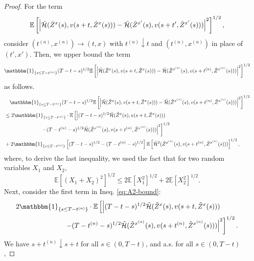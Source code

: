 \documentclass[11pt]{article}
\theoremstyle{definition}
\theoremstyle{plain}
\newcommand{\E}{\mathbb{E}}
\newcommand{\cH}{{\cal H}}
\newcommand{\mbOne}{\mathbbm{1}}
\begin{document}
\begin{appendices}
\begin{proof}
For the term
\[
\mathbb{E} \left[ \left| \tilde \cH(\tilde{Z}^x(s), v(s + t, \tilde{Z}^x(s))) 
- \tilde \cH(\tilde{Z}^{x'}(s), v(s + t', \tilde{Z}^{x'}(s))) \right|^2 \right]^{1/2}, 
\]
consider \( (t^{(n)}, x^{(n)}) \to (t,x) \) with \( t^{(n)} \downarrow t \) 
and \( (t^{(n)}, x^{(n)}) \) in place of \( (t', x') \). Then, we upper bound the term 
\begin{align*}
\mbOne_{\{s \leq T - t^{(n)}\}} (T - t - s)^{1/2} \mathbb{E} \left[ \left|  
\tilde \cH(\tilde{Z}^x(s), v(s + t, \tilde{Z}^x(s))) 
- \tilde \cH(\tilde{Z}^{x^{(n)}}(s), v(s + t^{(n)}, \tilde{Z}^{x^{(n)}}(s))) \right|^2 \right]^{1/2}
\end{align*}
as follows. 
\begin{align}
& \quad \mbOne_{\{s \leq T - t^{(n)}\}} (T - t - s)^{1/2} \mathbb{E} \left[ \left|  
\tilde \cH(\tilde{Z}^x(s), v(s + t, \tilde{Z}^x(s))) 
- \tilde \cH(\tilde{Z}^{x^{(n)}}(s), v(s + t^{(n)}, \tilde{Z}^{x^{(n)}}(s))) \right|^2 \right]^{1/2} \nonumber \\
& \leq 2 \mbOne_{\{s \leq T - t^{(n)}\}} \cdot \mathbb{E} \left[ \left| (T - t - s)^{1/2} 
\tilde \cH(\tilde{Z}^x(s), v(s + t, \tilde{Z}^x(s))) \right. \right. \nonumber \\
&\left. \left. \qquad \qquad \qquad \quad - (T - t^{(n)} - s)^{1/2} \tilde \cH(\tilde{Z}^{x^{(n)}}(s), v(s + t^{(n)}, \tilde{Z}^{x^{(n)}}(s))) \right|^2 \right]^{1/2} \nonumber \\
& + 2  \mbOne_{\{s \leq T - t^{(n)}\}} \left[ (T - t - s)^{1/2} - (T - t^{(n)} - s)^{1/2} \right] 
\mathbb{E} \left[ \tilde \cH^2(\tilde{Z}^{x^{(n)}}(s), v(s + t^{(n)}, \tilde{Z}^{x^{(n)}}(s))) \right]^{1/2},
\label{eq:A2-bound}
\end{align}
where, to derive the last inequality, we used the fact that for two random variables $X_1$ and $X_2$, 
\[
\E\left[(X_1 + X_2)^2\right]^{1/2} \leq 2 \E\left[X_1^2\right]^{1/2} + 2 \E\left[X_2^2\right]^{1/2}.
\]
Next, consider the first term in Ineq. \eqref{eq:A2-bound}:
\begin{align*}
& 2 \mbOne_{\{s \leq T - t^{(n)}\}} \cdot \mathbb{E} \left[ \left| (T - t - s)^{1/2} 
\tilde \cH(\tilde{Z}^x(s), v(s + t, \tilde{Z}^x(s))) \right. \right. \\
&\left. \left. \qquad \qquad \qquad \quad - (T - t^{(n)} - s)^{1/2} \tilde \cH(\tilde{Z}^{x^{(n)}}(s), v(s + t^{(n)}, \tilde{Z}^{x^{(n)}}(s))) \right|^2 \right]^{1/2}.
\end{align*}
We have \( s + t^{(n)} \downarrow s + t \) for all \( s \in (0,T - t) \),  
and a.s. for all \( s \in (0,T - t) \),  

\end{proof}
\end{appendices}
\end{document}
